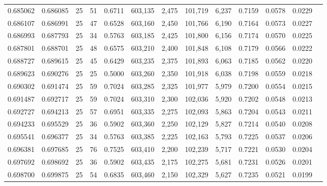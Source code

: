 \begin{tabular}{rrrrrrrrrrrrr}
0.685062 & 0.686085 &    25 &  51 &                                     0.6711 & 603,135 &   2,475 & 101,719 &   6,237 & 0.7159 & 0.0578 & 0.0229 \\
0.686107 & 0.686991 &    25 &  47 &                                     0.6528 & 603,160 &   2,450 & 101,766 &   6,190 & 0.7164 & 0.0573 & 0.0227 \\
0.686993 & 0.687793 &    25 &  34 &                                     0.5763 & 603,185 &   2,425 & 101,800 &   6,156 & 0.7174 & 0.0570 & 0.0225 \\
0.687801 & 0.688701 &    25 &  48 &                                     0.6575 & 603,210 &   2,400 & 101,848 &   6,108 & 0.7179 & 0.0566 & 0.0222 \\
0.688727 & 0.689615 &    25 &  45 &                                     0.6429 & 603,235 &   2,375 & 101,893 &   6,063 & 0.7185 & 0.0562 & 0.0220 \\
0.689623 & 0.690276 &    25 &  25 &                                     0.5000 & 603,260 &   2,350 & 101,918 &   6,038 & 0.7198 & 0.0559 & 0.0218 \\
0.690302 & 0.691474 &    25 &  59 &                                     0.7024 & 603,285 &   2,325 & 101,977 &   5,979 & 0.7200 & 0.0554 & 0.0215 \\
0.691487 & 0.692717 &    25 &  59 &                                     0.7024 & 603,310 &   2,300 & 102,036 &   5,920 & 0.7202 & 0.0548 & 0.0213 \\
0.692727 & 0.694213 &    25 &  57 &                                     0.6951 & 603,335 &   2,275 & 102,093 &   5,863 & 0.7204 & 0.0543 & 0.0211 \\
0.694233 & 0.695529 &    25 &  36 &                                     0.5902 & 603,360 &   2,250 & 102,129 &   5,827 & 0.7214 & 0.0540 & 0.0208 \\
0.695541 & 0.696377 &    25 &  34 &                                     0.5763 & 603,385 &   2,225 & 102,163 &   5,793 & 0.7225 & 0.0537 & 0.0206 \\
0.696381 & 0.697685 &    25 &  76 &                                     0.7525 & 603,410 &   2,200 & 102,239 &   5,717 & 0.7221 & 0.0530 & 0.0204 \\
0.697692 & 0.698692 &    25 &  36 &                                     0.5902 & 603,435 &   2,175 & 102,275 &   5,681 & 0.7231 & 0.0526 & 0.0201 \\
0.698700 & 0.699875 &    25 &  54 &                                     0.6835 & 603,460 &   2,150 & 102,329 &   5,627 & 0.7235 & 0.0521 & 0.0199 \\

\end{tabular}

